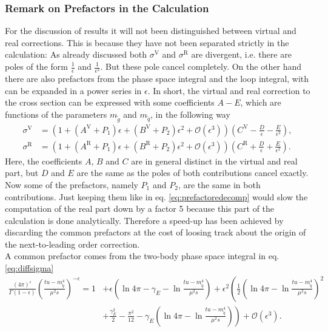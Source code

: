 \subsubsection{Remark on Prefactors in the Calculation}
For the discussion of results it will not been distinguished between virtual and real corrections. This is because they have not been separated strictly in the calculation: As already discussed both $\sigma^{\mathrm{V}}$ and $\sigma^{\mathrm{R}}$ are divergent, i.e. there are poles of the form $\frac{1}{\epsilon}$ and $\frac{1}{\epsilon^2}$. But these pole cancel completely. On the other hand there are also prefactors from the phase space integral and the loop integral, with can be expanded in a power series in $\epsilon$. In short, the virtual and real correction to the cross section can be expressed with some coefficients $A - E$, which are functions of the parameters $m_{\tilde{g}}$ and $m_{\tilde{q}}$, in the following way
\begin{align}
\sigma^{\mathrm{V}} &= \left( 1 + (A^{\mathrm{V}} + P_1)\epsilon + (B^{\mathrm{V}} + P_2)\epsilon^2 + \mathcal{O}(\epsilon^3) \right)\left( C^{\mathrm{V}} - \frac{D}{\epsilon} - \frac{E}{\epsilon^2} \right),\\
\sigma^{\mathrm{R}} &= \left( 1 + (A^{\mathrm{R}} + P_1)\epsilon + (B^{\mathrm{R}} + P_2)\epsilon^2 + \mathcal{O}(\epsilon^3) \right)\left( C^{\mathrm{R}} + \frac{D}{\epsilon} + \frac{E}{\epsilon^2} \right).\label{eq:prefactoredecomp}
\end{align}
Here, the coefficients $A$, $B$ and $C$ are in general distinct in the virtual and real part, but $D$ and $E$ are the same as the poles of both contributions cancel exactly.\\
Now some of the prefactors, namely $P_1$ and $P_2$, are the same in both contributions. Just keeping them like in eq. \eqref{eq:prefactoredecomp} would slow the computation of the real part down by a factor 5 because this part of the calculation is done analytically. Therefore a speed-up has been achieved by discarding the common prefactors at the cost of loosing track about the origin of the next-to-leading order correction.\\
A common prefactor comes from the two-body phase space integral in eq. \eqref{eq:diffsigma}
\begin{align}
\frac{(4\pi)^\epsilon}{\Gamma(1-\epsilon)}\left( \frac{tu - m_{\tilde{q}}^4}{\mu^2 s} \right)^{-\epsilon} = 1 &+ \epsilon\left( \ln 4\pi -\gamma_E - \ln \frac{tu - m_{\tilde{q}}^4}{\mu^2 s} \right) 
+ \epsilon^2\left( \frac{1}{2}\left( \ln 4\pi - \ln \frac{tu - m_{\tilde{q}}^4}{\mu^2 s} \right)^2 \right.\nonumber\\
&+ \left.\frac{\gamma_E^2}{2} - \frac{\pi^2}{12} - \gamma_E\left( \ln 4\pi - \ln \frac{tu - m_{\tilde{q}}^4}{\mu^2 s} \right) \right) + \mathcal{O}(\epsilon^3).\label{eq:PhasePrefactor}
\end{align}
